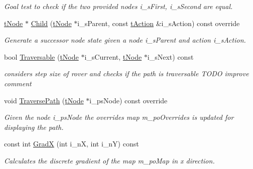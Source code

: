 \begin{DoxyCompactItemize}
\begin{DoxyCompactList}\small\item\em Goal test to check if the two provided nodes i\+\_\+s\+First, i\+\_\+s\+Second are equal. \end{DoxyCompactList}\item 
\mbox{\hyperlink{structplanner_1_1t_node}{t\+Node}} $\ast$ \mbox{\hyperlink{classplanner_1_1c_planner_a7ddb18b161e5d59cfe733bce32c31896}{Child}} (\mbox{\hyperlink{structplanner_1_1t_node}{t\+Node}} $\ast$i\+\_\+s\+Parent, const \mbox{\hyperlink{structplanner_1_1t_action}{t\+Action}} \&i\+\_\+s\+Action) const override
\begin{DoxyCompactList}\small\item\em Generate a successor node state given a node i\+\_\+s\+Parent and action i\+\_\+s\+Action. \end{DoxyCompactList}\item 
bool \mbox{\hyperlink{classplanner_1_1c_planner_a34b0582ca32cc235837c0b638b39e3af}{Traversable}} (\mbox{\hyperlink{structplanner_1_1t_node}{t\+Node}} $\ast$i\+\_\+s\+Current, \mbox{\hyperlink{structplanner_1_1t_node}{t\+Node}} $\ast$i\+\_\+s\+Next) const
\begin{DoxyCompactList}\small\item\em considers step size of rover and checks if the path is traversable T\+O\+DO improve comment \end{DoxyCompactList}\item 
void \mbox{\hyperlink{classplanner_1_1c_planner_ad9389067cbc3fa6fb1c2efdf3f344664}{Traverse\+Path}} (\mbox{\hyperlink{structplanner_1_1t_node}{t\+Node}} $\ast$i\+\_\+ps\+Node) const override
\begin{DoxyCompactList}\small\item\em Given the node i\+\_\+ps\+Node the overrides map m\+\_\+po\+Overrides is updated for displaying the path. \end{DoxyCompactList}\item 
\mbox{\label{classplanner_1_1c_planner_aa90d751ce544870e4c89494e06fdac6c}} 
const int \mbox{\hyperlink{classplanner_1_1c_planner_aa90d751ce544870e4c89494e06fdac6c}{GradX}} (int i\+\_\+nX, int i\+\_\+nY) const
\begin{DoxyCompactList}\small\item\em Calculates the discrete gradient of the map m\+\_\+po\+Map in x direction. \end{DoxyCompactList}\item 

\end{DoxyCompactItemize}
